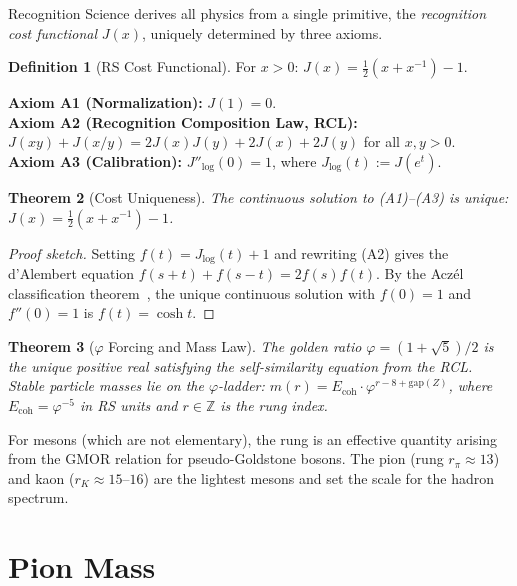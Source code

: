 \documentclass[12pt,a4paper]{article}
\newtheorem{theorem}{Theorem}[section]
\theoremstyle{definition}
\newtheorem{definition}[theorem]{Definition}
\theoremstyle{remark}
\begin{document}
Recognition Science derives all physics from a single primitive,
the \emph{recognition cost functional} $J(x)$, uniquely determined
by three axioms.

\begin{definition}[RS Cost Functional]
For $x > 0$: $J(x) = \tfrac{1}{2}(x + x^{-1}) - 1$.
\end{definition}

\noindent\textbf{Axiom A1 (Normalization):} $J(1) = 0$.\\
\textbf{Axiom A2 (Recognition Composition Law, RCL):}
$J(xy) + J(x/y) = 2J(x)J(y) + 2J(x) + 2J(y)$ for all $x, y > 0$.\\
\textbf{Axiom A3 (Calibration):} $J''_{\log}(0) = 1$, where
$J_{\log}(t) := J(e^t)$.

\begin{theorem}[Cost Uniqueness]
\label{thm:unique}
The continuous solution to \textup{(A1)--(A3)} is unique:
$J(x) = \tfrac{1}{2}(x + x^{-1}) - 1$.
\end{theorem}

\begin{proof}[Proof sketch]
Setting $f(t) = J_{\log}(t) + 1$ and rewriting \textup{(A2)} gives the
d'Alembert equation $f(s+t) + f(s-t) = 2f(s)f(t)$.  By the Acz\'el
classification theorem~\cite{Aczel1966}, the unique continuous solution
with $f(0) = 1$ and $f''(0) = 1$ is $f(t) = \cosh t$.
\end{proof}

\begin{theorem}[$\varphi$ Forcing and Mass Law]
\label{thm:phi}
The golden ratio $\varphi = (1+\sqrt{5})/2$ is the unique positive real
satisfying the self-similarity equation from the RCL\@.  Stable particle
masses lie on the $\varphi$-ladder: $m(r) = E_{\mathrm{coh}} \cdot
\varphi^{r - 8 + \mathrm{gap}(Z)}$, where $E_{\mathrm{coh}} = \varphi^{-5}$
in RS units and $r \in \mathbb{Z}$ is the rung index.
\end{theorem}

\noindent For mesons (which are not elementary), the rung is an effective
quantity arising from the GMOR relation for pseudo-Goldstone bosons.  The
pion (rung $r_\pi \approx 13$) and kaon ($r_K \approx 15$--$16$) are the
lightest mesons and set the scale for the hadron spectrum.

\section{Pion Mass}
\label{sec:pion}
\end{document}
